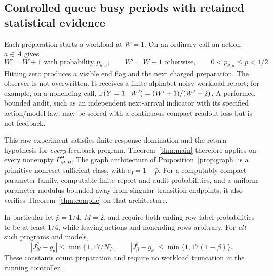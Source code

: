 \subsection{Controlled queue busy periods with retained statistical evidence}
\begin{theorem}\label{thm:queue}
Each preparation starts a workload at $W=1$. On an ordinary call an action $a\in A$ gives
\[
 W'=W+1\text{ with probability }p_{\theta,a},\qquad
 W'=W-1\text{ otherwise},\qquad
 0<p_{\theta,a}\le\bar p<1/2.
\]
Hitting zero produces a visible end flag and the next charged preparation. The observer is not overwritten. It receives a finite-alphabet noisy workload report; for example, on a nonending call,
$\mathbb P(Y=1\mid W')=(W'+1)/(W'+2)$.
A performed bounded audit, such as an independent next-arrival indicator with its specified action/model law, may be scored with a continuous compact readout loss but is not feedback.

This raw experiment satisfies finite-response domination and the return hypothesis for \emph{every} feedback program. Theorem~\ref{thm:main} therefore applies on every nonempty $\Gamma_{M,H}^\Theta$. The graph architecture of Proposition~\ref{prop:graph} is a primitive nonreset sufficient class, with $c_0=1-\bar p$. For a computably compact parameter family, computable finite report and audit probabilities, and a uniform parameter modulus bounded away from singular transition endpoints, it also verifies Theorem~\ref{thm:compile} on that architecture.

In particular let $\bar p=1/4$, $M=2$, and require both ending-row label probabilities to be at least $1/4$, while leaving actions and nonending rows arbitrary. For \emph{all} such programs and models,
\begin{equation}\label{eq:queue17}
 |J_N^\theta-g_\theta|\le\min\{1,17/N\},\qquad
 |J_\beta^\theta-g_\theta|\le\min\{1,17(1-\beta)\}.
\end{equation}
These constants count preparation and require no workload truncation in the running controller.
\end{theorem}
